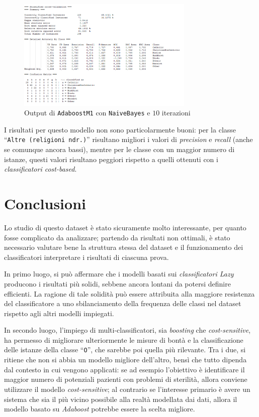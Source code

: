\documentclass[a4paper,11pt,twoside,notitlepage,final]{scrartcl}
\begin{document}
\begin{figure}[H]
  \centering
  \includegraphics[width=0.75\textwidth]{fig/AdaboostBayes.PNG}%
  \caption{Output di \texttt{AdaboostM1} con \texttt{NaiveBayes} e \(10\) iterazioni}%
  \label{fig:adaboost:bayes}
\end{figure}

I risultati per questo modello non sono particolarmente buoni: per la classe ``\texttt{Altre (religioni ndr.)}'' risultano migliori i valori di \emph{precision} e \emph{recall} (anche se comunque ancora bassi),
mentre per le classe con un maggior numero di istanze, questi valori risultano peggiori rispetto a quelli ottenuti con i \emph{classificatori cost-based}.

\newpage

\section{Conclusioni}


Lo studio di questo dataset è stato sicuramente molto interessante, per quanto fosse complicato da analizzare;
partendo da risultati non ottimali, è stato necessario valutare bene la struttura stessa del dataset e il funzionamento dei classificatori
interpretare i risultati di ciascuna prova.

In primo luogo, si può affermare che i modelli basati sui \emph{classificatori Lazy} producono i risultati più solidi, sebbene ancora lontani da potersi definire efficienti.
La ragione di tale solidità può essere attribuita alla maggiore resistenza del classificatore a uno sbilanciamento della frequenza delle classi nel dataset rispetto agli altri modelli impiegati.

In secondo luogo, l'impiego di multi-classificatori, sia \emph{boosting} che \emph{cost-sensitive},
ha permesso di migliorare ulteriormente le misure di bontà e la classificazione delle istanze della classe ``\texttt{O}'', che sarebbe poi quella più rilevante.
Tra i due, si ritiene che non si abbia un modello migliore dell'altro, bensì che tutto dipenda dal contesto in cui vengono applicati:
se ad esempio l'obiettivo è identificare il maggior numero di potenziali pazienti con problemi di sterilità, allora conviene utilizzare il modello \emph{cost-sensitive};
al contrario se l'interesse primario è avere un sistema che sia il più vicino possibile alla realtà modellata dai dati, allora il modello basato su \emph{Adaboost} potrebbe essere la scelta migliore.
\end{document}
